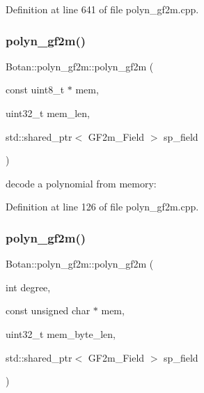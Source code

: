 Definition at line 641 of file polyn\+\_\+gf2m.\+cpp.

\mbox{\label{class_botan_1_1polyn__gf2m_af9619fa1c8180c0e729d883a89ea3ffc}} 
\subsubsection{\texorpdfstring{polyn\+\_\+gf2m()}{polyn\_gf2m()}\hspace{0.1cm}{\footnotesize\ttfamily [4/5]}}
{\footnotesize\ttfamily Botan\+::polyn\+\_\+gf2m\+::polyn\+\_\+gf2m (\begin{DoxyParamCaption}\item[{const uint8\+\_\+t $\ast$}]{mem,  }\item[{uint32\+\_\+t}]{mem\+\_\+len,  }\item[{std\+::shared\+\_\+ptr$<$ G\+F2m\+\_\+\+Field $>$}]{sp\+\_\+field }\end{DoxyParamCaption})}

decode a polynomial from memory\+: 

Definition at line 126 of file polyn\+\_\+gf2m.\+cpp.

\mbox{\label{class_botan_1_1polyn__gf2m_a87baa4743b62dc4cbb4c1d73e4578d8c}} 
\subsubsection{\texorpdfstring{polyn\+\_\+gf2m()}{polyn\_gf2m()}\hspace{0.1cm}{\footnotesize\ttfamily [5/5]}}
{\footnotesize\ttfamily Botan\+::polyn\+\_\+gf2m\+::polyn\+\_\+gf2m (\begin{DoxyParamCaption}\item[{int}]{degree,  }\item[{const unsigned char $\ast$}]{mem,  }\item[{uint32\+\_\+t}]{mem\+\_\+byte\+\_\+len,  }\item[{std\+::shared\+\_\+ptr$<$ G\+F2m\+\_\+\+Field $>$}]{sp\+\_\+field }\end{DoxyParamCaption})}

